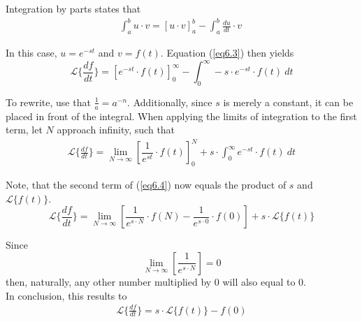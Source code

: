 \begin{tcolorbox}[colback=gray!5!white,colframe=gray!!black,title=Proof 6.1]
Integration by parts states that
\begin{align}
\int_{a}^{b}{u\cdot v}=\left[u\cdot v\right]_{a}^{b}-\int_{a}^{b} \frac{du}{dt}\cdot v\
\label{eq6.3}
\end{align}

In this case, $u=e^{-st}$ and $v=f(t)$.
Equation (\ref{eq6.3}) then yields
$$\mathcal{L}\{\frac{df}{dt}\}=\left[e^{-st}\cdot f(t)\right]_{0}^{\infty}-\int_{0}^{\infty} -s\cdot e^{-st}\cdot f(t)\ dt$$

To rewrite, use that $\frac{1}{a}=a^{-n}$. Additionally, since $s$ is merely a constant, it can be placed in front of the integral. When applying the limits of integration to the first term, let $N$ approach infinity, such that
\begin{align}
\mathcal{L}\{\frac{df}{dt}\}=\lim_{N \to \infty}\left[\dfrac{1}{e^{st}}\cdot f(t)\right]_{0}^{N}+s\cdot \int_{0}^{\infty}e^{-st}\cdot f(t)\ dt
\label{eq6.4}
\end{align}

Note, that the second term of (\ref{eq6.4}) now equals the product of $s$ and $\mathcal{L}\{f(t)\}$.
$$\mathcal{L}\{\frac{df}{dt}\} = \lim_{N \to \infty}\left[\dfrac{1}{e^{s\cdot N}}\cdot f(N)-\dfrac{1}{e^{s\cdot 0}}\cdot f(0)\right]+s\cdot \mathcal{L}\{f(t)\}$$

Since $$\lim_{N \to \infty}\left[\dfrac{1}{e^{s\cdot N}}\right]=0$$ then, naturally, any other number multiplied by 0 will also equal to 0.\\
In conclusion, this results to
\begin{align*}
\mathcal{L}\{\frac{df}{dt}\} = s\cdot \mathcal{L}\{f(t)\}-f(0)
\end{align*}
\end{tcolorbox}
